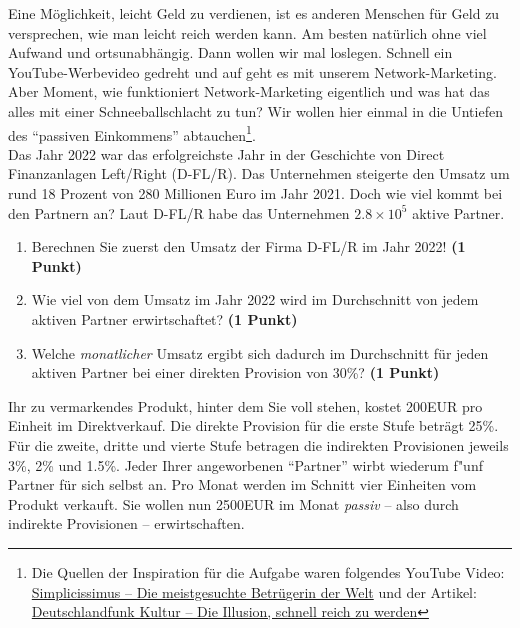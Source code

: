 \documentclass[a4paper, 9pt]{scrartcl}\usepackage[]{graphicx}\usepackage[]{xcolor}
\begin{document}
Eine M{\"o}glichkeit, leicht Geld zu verdienen, ist es anderen Menschen f{\"u}r Geld
zu versprechen, wie man leicht reich werden kann. Am besten nat{\"u}rlich ohne
viel Aufwand und ortsunabh{\"a}ngig. Dann wollen wir mal loslegen. Schnell
ein YouTube-Werbevideo gedreht und auf geht es mit unserem
Network-Marketing. Aber Moment, wie funktioniert Network-Marketing
eigentlich und was hat das alles mit einer Schneeballschlacht zu tun? Wir
wollen hier einmal in die Untiefen des "`passiven Einkommens"'
abtauchen\footnote{Die Quellen der Inspiration f{\"u}r die Aufgabe waren
  folgendes YouTube Video:
  \href{https://youtu.be/UOKkZF_qK9M?si=uf4foJVFKfeQMwSw}{Simplicissimus --
    Die meistgesuchte Betr{\"u}gerin der Welt} und der Artikel:
  \href{https://www.deutschlandfunkkultur.de/netzwerk-marketing-die-illusion-schnell-reich-zu-werden-100.html}{
    Deutschlandfunk Kultur -- Die Illusion, schnell reich zu werden}}.\\

Das Jahr 2022 war das erfolgreichste Jahr in der Geschichte von
Direct Finanzanlagen Left/Right (D-FL/R). Das Unternehmen steigerte den Umsatz um rund
18 Prozent von 280 Millionen Euro im Jahr
2021. Doch wie viel kommt bei den Partnern an? Laut
D-FL/R habe das Unternehmen \ensuremath{2.8\times 10^{5}} aktive Partner.

\begin{enumerate}
\item Berechnen Sie zuerst den Umsatz der Firma D-FL/R im
  Jahr 2022! \textbf{(1 Punkt)}
\item Wie viel von dem Umsatz im Jahr 2022 wird im Durchschnitt von jedem
  aktiven Partner erwirtschaftet? \textbf{(1 Punkt)}
\item Welche \textit{monatlicher} Umsatz ergibt sich dadurch im
  Durchschnitt f{\"u}r jeden aktiven Partner bei einer direkten Provision von
  30\%? \textbf{(1 Punkt)}
\end{enumerate}

Ihr zu vermarkendes Produkt, hinter dem Sie voll stehen, kostet
200EUR pro Einheit im Direktverkauf. Die direkte Provision
f{\"u}r die erste Stufe betr{\"a}gt 25\%. F{\"u}r die zweite, dritte und
vierte Stufe betragen die indirekten Provisionen jeweils 3\%,
2\% und 1.5\%. Jeder Ihrer angeworbenen "`Partner"'
wirbt wiederum f{"u}nf Partner f{\"u}r sich selbst an. Pro Monat
werden im Schnitt vier Einheiten vom Produkt verkauft. Sie wollen nun
2500EUR im Monat \textit{passiv} -- also durch indirekte
Provisionen -- erwirtschaften.
\end{document}
